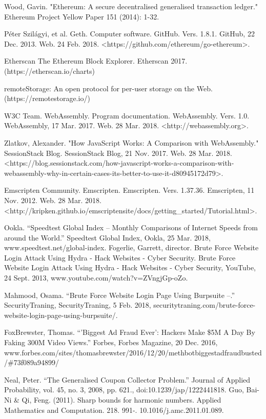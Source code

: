 \documentclass[runningheads]{llncs}
\begin{document}
\begin{thebibliography}{1}
Wood, Gavin. "Ethereum: A secure decentralised generalised transaction ledger." Ethereum Project Yellow Paper 151 (2014): 1-32.

Péter Szilágyi, et al. Geth. Computer software. GitHub. Vers. 1.8.1. GitHub, 22 Dec. 2013. Web. 24 Feb. 2018. <https://github.com/ethereum/go-ethereum>. 

Etherscan The Ethereum Block Explorer. Etherscan 2017. (https://etherscan.io/charts)

 remoteStorage: An open protocol for per-user storage on the Web. (https://remotestorage.io/)

  W3C Team. WebAssembly. Program documentation. WebAssembly. Vers. 1.0. WebAssembly, 17 Mar. 2017. Web. 28 Mar. 2018. <http://webassembly.org>. 

 Zlatkov, Alexander. "How JavaScript Works: A Comparison with WebAssembly." SessionStack Blog. SessionStack Blog, 21 Nov. 2017. Web. 28 Mar. 2018. <https://blog.sessionstack.com/how-javascript-works-a-comparison-with-webassembly-why-in-certain-cases-its-better-to-use-it-d80945172d79>. 

 Emscripten Community. Emscripten. Emscripten. Vers. 1.37.36. Emscripten, 11 Nov. 2012. Web. 28 Mar. 2018. <http://kripken.github.io/emscripten\-site/docs/getting\_started/Tutorial.html>. 

 Ookla. “Speedtest Global Index – Monthly Comparisons of Internet Speeds from around the World.” Speedtest Global Index, Ookla, 25 Mar. 2018, www.speedtest.net/global-index.
  Fogerlie, Garrett, director. Brute Force Website Login Attack Using Hydra - Hack Websites - Cyber Security. Brute Force Website Login Attack Using Hydra - Hack Websites - Cyber Security, YouTube, 24 Sept. 2013, www.youtube.com/watch?v=ZVngjGp-oZo. 

 Mahmood, Osama. “Brute Force Website Login Page Using Burpsuite –.” SecurityTraning, SecurityTraning, 5 Feb. 2018, securitytraning.com/brute-force-website-login-page-using-burpsuite/. 

 Fox\-Brewster, Thomas. ``'Biggest Ad Fraud Ever': Hackers Make \$5M A Day By Faking 300M Video Views.'' Forbes, Forbes Magazine, 20 Dec. 2016, www.forbes.com/sites/thomasbrewster/2016/12/20/methbot\-biggest\-ad\-fraud\-busted/\#73f089a94899/ 

 Neal, Peter. ``The Generalised Coupon Collector Problem.'' Journal of Applied Probability, vol. 45, no. 3, 2008, pp. 621., doi:10.1239/jap/1222441818.
 Guo, Bai-Ni \& Qi, Feng. (2011). Sharp bounds for harmonic numbers. Applied Mathematics and Computation. 218. 991-. 10.1016/j.amc.2011.01.089.
\end{thebibliography}

\addtolength{\textheight}{-7cm}
\balance


\end{document}
